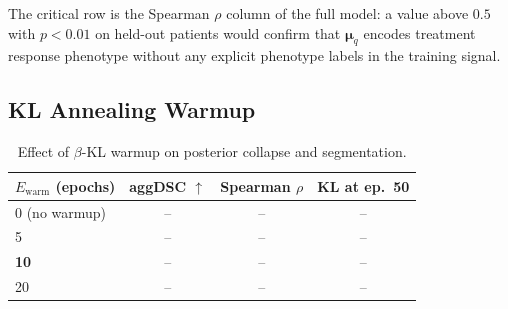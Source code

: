 \noindent The critical row is the Spearman $\rho$ column of the full model:
a value above $0.5$ with $p < 0.01$ on held-out patients would confirm that
$\boldsymbol{\mu}_q$ encodes treatment response phenotype without any
explicit phenotype labels in the training signal.

\subsection{KL Annealing Warmup}
\label{sec:ablations:kl}

\begin{table}[h]
\centering
\caption{Effect of $\beta$-KL warmup on posterior collapse and segmentation.}
\label{tab:ablation_kl}
\begin{tabular}{lccc}
\toprule
$E_{\text{warm}}$ (epochs) & aggDSC $\uparrow$ & Spearman $\rho$ & KL at ep.~50 \\
\midrule
0 (no warmup)   & -- & -- & -- \\
5               & -- & -- & -- \\
\textbf{10}     & -- & -- & -- \\
20              & -- & -- & -- \\
\bottomrule
\end{tabular}
\end{table}
